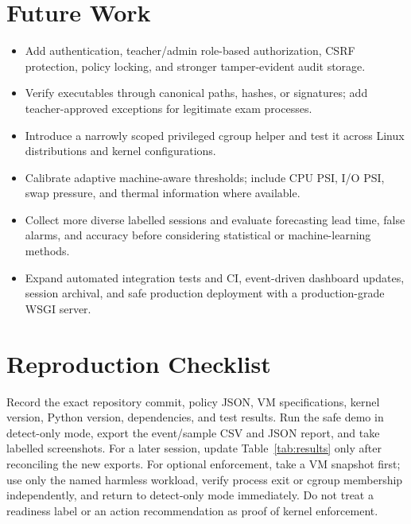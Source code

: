 \documentclass[12pt,a4paper]{article}
\begin{document}
\section{Future Work}
\begin{itemize}
\item Add authentication, teacher/admin role-based authorization, CSRF protection, policy locking, and stronger tamper-evident audit storage.
\item Verify executables through canonical paths, hashes, or signatures; add teacher-approved exceptions for legitimate exam processes.
\item Introduce a narrowly scoped privileged cgroup helper and test it across Linux distributions and kernel configurations.
\item Calibrate adaptive machine-aware thresholds; include CPU PSI, I/O PSI, swap pressure, and thermal information where available.
\item Collect more diverse labelled sessions and evaluate forecasting lead time, false alarms, and accuracy before considering statistical or machine-learning methods.
\item Expand automated integration tests and CI, event-driven dashboard updates, session archival, and safe production deployment with a production-grade WSGI server.
\end{itemize}

\appendix
\section{Reproduction Checklist}
Record the exact repository commit, policy JSON, VM specifications, kernel version, Python version, dependencies, and test results. Run the safe demo in detect-only mode, export the event/sample CSV and JSON report, and take labelled screenshots. For a later session, update Table~\ref{tab:results} only after reconciling the new exports. For optional enforcement, take a VM snapshot first; use only the named harmless workload, verify process exit or cgroup membership independently, and return to detect-only mode immediately. Do not treat a readiness label or an action recommendation as proof of kernel enforcement.
\end{document}
